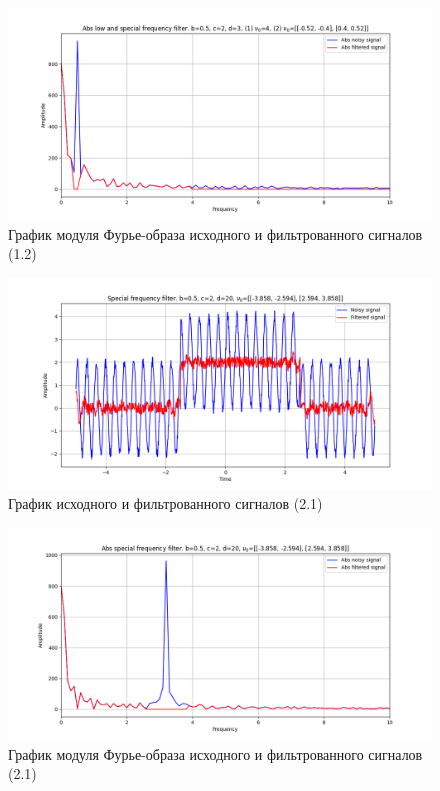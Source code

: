 \documentclass[a4paper, 12pt]{article}
\begin{document}
    \begin{figure}[H]
        \centering
        \includegraphics[scale=0.48]{1_abs_nospec_nohigh.png}
        \captionsetup{skip=0pt}
        \caption{График модуля Фурье-образа исходного и фильтрованного сигналов (1.2)}
        \label{fig:fig78}
    \end{figure}
    \begin{figure}[H]
        \centering
        \includegraphics[scale=0.48]{2_nospec.png}
        \captionsetup{skip=0pt}
        \caption{График исходного и фильтрованного сигналов (2.1)}
        \label{fig:fig712}
    \end{figure}
    \begin{figure}[H]
        \centering
        \includegraphics[scale=0.48]{2_abs_nospec.png}
        \captionsetup{skip=0pt}
        \caption{График модуля Фурье-образа исходного и фильтрованного сигналов (2.1)}
        \label{fig:fig722}
    \end{figure}
\end{document}
